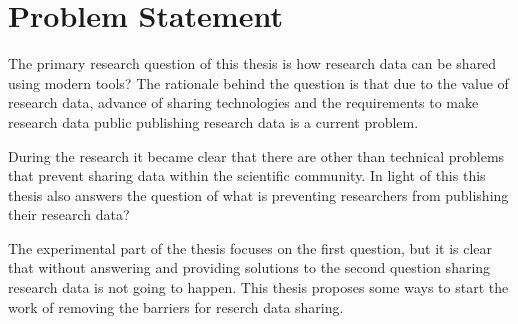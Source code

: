 \chapter{Problem Statement}
\label{chapter:problem}

The primary research question of this thesis is how research data can be shared
using modern tools? The rationale behind the question is that due to the
value of research data, advance of sharing technologies and the requirements
to make research data public publishing research data is a current problem.

During the research it became clear that there are other than technical
problems that prevent sharing data within the scientific community. In light
of this this thesis also answers the question of what is preventing researchers
from publishing their research data?

The experimental part of the thesis focuses on the first question, but it is
clear that without answering and providing solutions to the second question
sharing research data is not going to happen. This thesis proposes some ways
to start the work of removing the barriers for reserch data sharing.

\iffalse
This is a chapter where we rigoriously define the problem statement.

Here is the problem background:

\begin{itemize}
    \item there is a growing demand on making research data public for other
          scientist and the public
    \item demand from funding agencies and open access community
    \item also scientific principles - how are you going to replicate others'
          work without the same datasets?
    \item furthering science
    \item these points need to be made concise and be backed up with literature
\end{itemize}

And here is what practical problems it will pose:

\begin{itemize}
    \item no infrastructure
    \item no know-how
    \item no culture
    \item there is demand, but there are no repercussions for not sharing the
          data
    \item many datasets are not suitable for publishing as is
\end{itemize}

\fi
